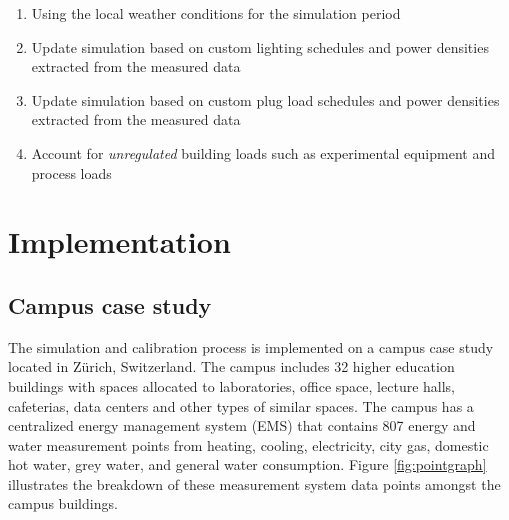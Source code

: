 \documentclass{tBPS2e}
\theoremstyle{plain}
\theoremstyle{definition}
\theoremstyle{remark}
\begin{document}
\begin{enumerate}
  \item Using the local weather conditions for the simulation period
  \item Update simulation based on custom lighting schedules and power densities extracted from the measured data
  \item Update simulation based on custom plug load schedules and power densities extracted from the measured data
  \item Account for \emph{unregulated} building loads such as experimental equipment and process loads
\end{enumerate}
 
\section{Implementation}\label{Implementation}
\subsection{Campus case study}
The simulation and calibration process is implemented on a campus case study located in Z\"urich, Switzerland. The campus includes 32 higher education buildings with spaces allocated to laboratories, office space, lecture halls, cafeterias, data centers and other types of similar spaces. The campus has a centralized energy management system (EMS) that contains 807 energy and water measurement points from heating, cooling, electricity, city gas, domestic hot water, grey water, and general water consumption. Figure \ref{fig:pointgraph} illustrates the breakdown of these measurement system data points amongst the campus buildings.
\end{document}
